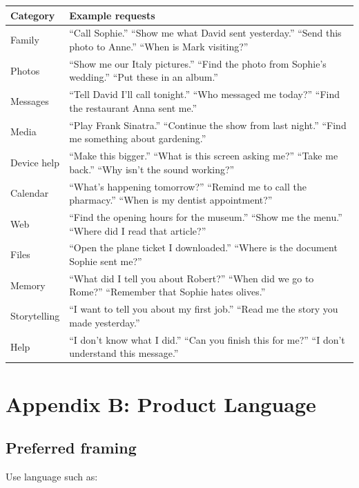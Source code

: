 \documentclass[11pt]{article}
\begin{document}
\begin{longtable}{p{} p{}}
\toprule
Category & Example requests \\
\midrule
Family & ``Call Sophie.'' ``Show me what David sent yesterday.'' ``Send this photo to Anne.'' ``When is Mark visiting?'' \\
\addlinespace
Photos & ``Show me our Italy pictures.'' ``Find the photo from Sophie's wedding.'' ``Put these in an album.'' \\
\addlinespace
Messages & ``Tell David I'll call tonight.'' ``Who messaged me today?'' ``Find the restaurant Anna sent me.'' \\
\addlinespace
Media & ``Play Frank Sinatra.'' ``Continue the show from last night.'' ``Find me something about gardening.'' \\
\addlinespace
Device help & ``Make this bigger.'' ``What is this screen asking me?'' ``Take me back.'' ``Why isn't the sound working?'' \\
\addlinespace
Calendar & ``What's happening tomorrow?'' ``Remind me to call the pharmacy.'' ``When is my dentist appointment?'' \\
\addlinespace
Web & ``Find the opening hours for the museum.'' ``Show me the menu.'' ``Where did I read that article?'' \\
\addlinespace
Files & ``Open the plane ticket I downloaded.'' ``Where is the document Sophie sent me?'' \\
\addlinespace
Memory & ``What did I tell you about Robert?'' ``When did we go to Rome?'' ``Remember that Sophie hates olives.'' \\
\addlinespace
Storytelling & ``I want to tell you about my first job.'' ``Read me the story you made yesterday.'' \\
\addlinespace
Help & ``I don't know what I did.'' ``Can you finish this for me?'' ``I don't understand this message.'' \\
\bottomrule
\end{longtable}

\section{Appendix B: Product Language}

\subsection{Preferred framing}
Use language such as:
\end{document}
